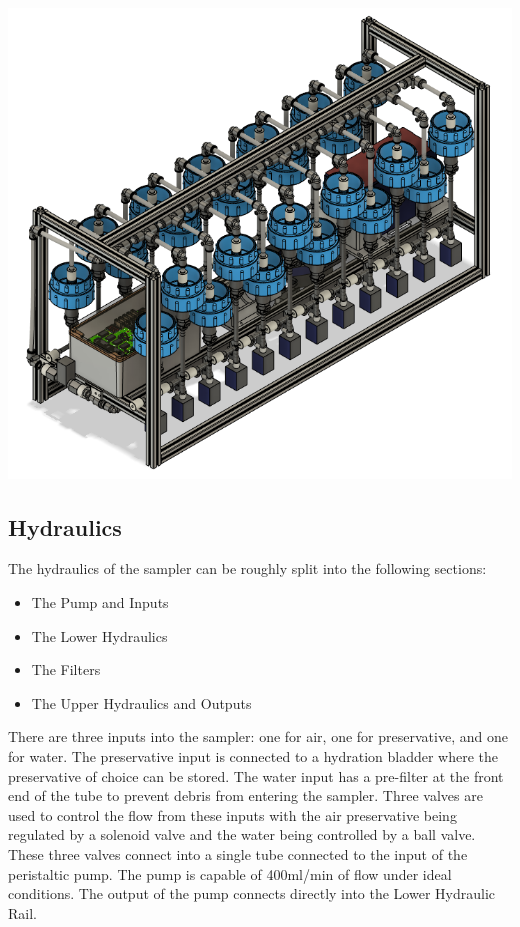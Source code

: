 \documentclass[11pt, letterpaper]{article}
\begin{document}
\begin{center}
	\includegraphics[scale=0.5]{./Assets/Sampler CAD.png} %
\end{center}

\subsection{Hydraulics}
The hydraulics of the sampler can be roughly split into the following sections:
\begin{itemize}
	\item The Pump and Inputs
	\item The Lower Hydraulics
	\item The Filters
	\item The Upper Hydraulics and Outputs
\end{itemize}
There are three inputs into the sampler: one for air, one for preservative, and one for water. The preservative input is connected to a hydration bladder where the preservative of choice can be stored. The water input has a pre-filter at the front end of the tube to prevent debris from entering the sampler. Three valves are used to control the flow from these inputs with the air preservative being regulated by a solenoid valve and the water being controlled by a ball valve. These three valves connect into a single tube connected to the input of the peristaltic pump.
The pump is capable of 400ml/min of flow under ideal conditions. The output of the pump connects directly into the Lower Hydraulic Rail. 
\end{document}

